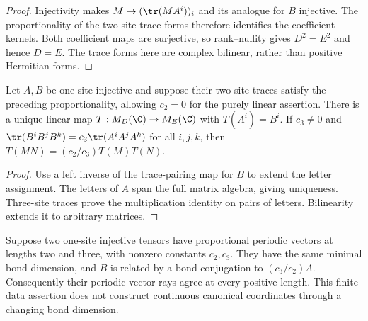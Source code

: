 \begin{proof}\leanok
    Injectivity makes $M\mapsto(\tr(MA^i))_i$ and its analogue for $B$
    injective. The proportionality of the two-site trace forms therefore
    identifies the coefficient kernels. Both coefficient maps are
    surjective, so rank--nullity gives $D^2=E^2$ and hence $D=E$.
    The trace forms here are complex bilinear, rather than positive
    Hermitian forms.
\end{proof}

\begin{lemma}
    \label{thm:spt_finite_three_site_trace_algebra}
    \leanok
    Let $A,B$ be one-site injective and suppose their two-site traces
    satisfy the preceding proportionality, allowing $c_2=0$ for the
    purely linear assertion. There is a unique linear map
    $T:M_D(\C)\to M_E(\C)$ with $T(A^i)=B^i$.
    If $c_3\ne0$ and
    $\tr(B^iB^jB^k)=c_3\tr(A^iA^jA^k)$ for all $i,j,k$, then
    $T(MN)=(c_2/c_3)T(M)T(N)$.
\end{lemma}

\begin{proof}\leanok
    Use a left inverse of the trace-pairing map for $B$ to extend the
    letter assignment. The letters of $A$ span the full matrix algebra,
    giving uniqueness. Three-site traces prove the multiplication identity
    on pairs of letters. Bilinearity extends it to arbitrary matrices.
\end{proof}

\begin{lemma}
    \label{thm:spt_finite_ring_reconstruction}
    \leanok
    Suppose two one-site injective tensors have proportional periodic
    vectors at lengths two and three, with nonzero constants $c_2,c_3$.
    They have the same minimal bond dimension, and $B$ is related by
    a bond conjugation to $(c_3/c_2)A$. Consequently their periodic
    vector rays agree at every positive length.
    This finite-data assertion does not construct continuous canonical
    coordinates through a changing bond dimension.
\end{lemma}

